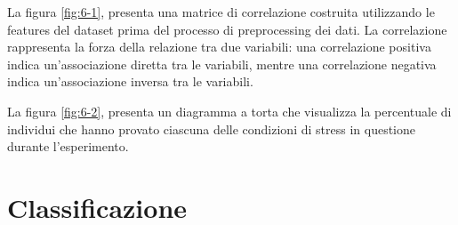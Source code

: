 La figura \ref{fig:6-1}, presenta una matrice di correlazione costruita utilizzando le features del dataset prima del processo di preprocessing dei dati. La correlazione rappresenta la forza della relazione tra due variabili: una correlazione positiva indica un'associazione diretta tra le variabili, mentre una correlazione negativa indica un'associazione inversa tra le variabili.

\bigskip

La figura \ref{fig:6-2}, presenta un diagramma a torta che visualizza la percentuale di individui che hanno provato ciascuna delle condizioni di stress in questione durante l'esperimento.

\section{Classificazione}

